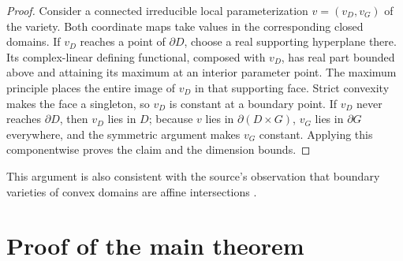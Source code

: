 \documentclass[11pt]{article}
\newcommand{\bd}{\partial}
\begin{document}
\begin{proof}
Consider a connected irreducible local parameterization
$v=(v_D,v_G)$ of the variety.  Both coordinate maps take values in the
corresponding closed domains.  If $v_D$ reaches a point of $\bd D$, choose a
real supporting hyperplane there.  Its complex-linear defining functional,
composed with $v_D$, has real part bounded above and attaining its maximum at
an interior parameter point.  The maximum principle places the entire image
of $v_D$ in that supporting face.  Strict convexity makes the face a
singleton, so $v_D$ is constant at a boundary point.  If $v_D$ never reaches
$\bd D$, then $v_D$ lies in $D$; because $v$ lies in $\bd(D\times G)$,
$v_G$ lies in $\bd G$ everywhere, and the symmetric argument makes $v_G$
constant.  Applying this componentwise proves the claim and the dimension
bounds.
\end{proof}

This argument is also consistent with the source's observation that boundary
varieties of convex domains are affine intersections \cite{CSS,CSS20}.

\section{Proof of the main theorem}
\end{document}
